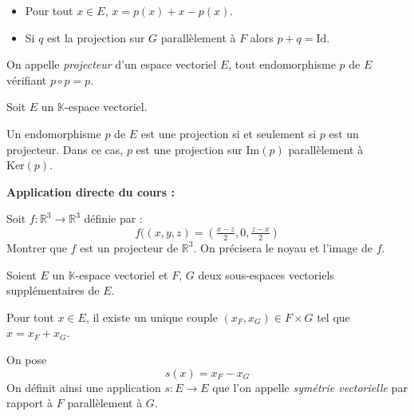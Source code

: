\documentclass[french,11pt,twoside]{VcCours}
\newenvironment{ApplicationDirecte}{\textbf{Application directe du cours :}

}{}
\begin{document}
\begin{Demonstration}{}

\vspace{24cm}


\end{Demonstration}
\newpage

\begin{Remarques}{}
\begin{itemize} 
\item Pour tout $x \in E$, $x=p(x)+x-p(x)$. 
\item Si $q$ est la projection sur $G$ parallèlement à $F$ alors $p+q=\textrm{Id}$.
\end{itemize}
\end{Remarques}{}

\begin{Definition}{} On appelle \emph{projecteur} d'un espace vectoriel $E$, tout endomorphisme $p$ de $E$ vérifiant $p \circ p = p$.
\end{Definition}

\begin{Proposition}{} Soit $E$ un $\mathbb{K}$-espace vectoriel.

Un endomorphisme $p$ de $E$ est une projection si et seulement si $p$ est un projecteur. Dans ce cas, $p$ est une projection sur $\textrm{Im}(p)$ parallèlement à $\textrm{Ker}(p)$.
\end{Proposition}

\begin{Demonstration}{}
\vspace{12cm}

\end{Demonstration}
\newpage

\begin{ApplicationDirecte} Soit $f : \mathbb{R}^3 \rightarrow \mathbb{R}^3$ définie par :
$$ f((x,y,z)=(\tfrac{x-z}{2},0,\tfrac{z-x}{2})$$
Montrer que $f$ est un projecteur de $\mathbb{R}^3$. On précisera le noyau et l'image de $f$.
\end{ApplicationDirecte}

\begin{Definition}{}
	Soient $E$ un $\mathbb{K}$-espace vectoriel 
	et $F$, $G$ deux sous-espaces vectoriels supplémentaires de $E$.

	Pour tout $x \in E$, il existe un unique couple $(x_F,x_G) \in F \times G$ 
	tel que $x=x_F+x_G$.
	
	On pose \[s(x)=x_F-x_G\]
	On définit ainsi une application $s : E \rightarrow E$ que l'on appelle 
	\emph{symétrie vectorielle} par rapport à $F$ parallèlement à $G$. 
\end{Definition}
\end{document}
